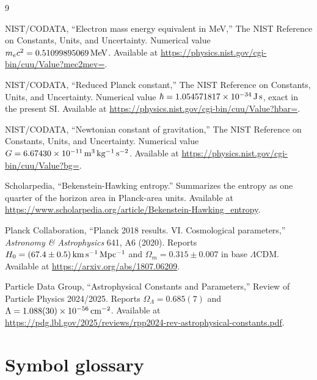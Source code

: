\documentclass[11pt]{article}
\begin{document}
\begin{thebibliography}{9}

NIST/CODATA, ``Electron mass energy equivalent in MeV,'' The NIST Reference on Constants, Units, and Uncertainty. Numerical value $m_ec^2=0.51099895069\,{\rm MeV}$. Available at \url{https://physics.nist.gov/cgi-bin/cuu/Value?mec2mev=}.

NIST/CODATA, ``Reduced Planck constant,'' The NIST Reference on Constants, Units, and Uncertainty. Numerical value $\hbar=1.054571817\times10^{-34}\,{\rm J\,s}$, exact in the present SI. Available at \url{https://physics.nist.gov/cgi-bin/cuu/Value?hbar=}.

NIST/CODATA, ``Newtonian constant of gravitation,'' The NIST Reference on Constants, Units, and Uncertainty. Numerical value $G=6.67430\times10^{-11}\,{\rm m^3\,kg^{-1}\,s^{-2}}$. Available at \url{https://physics.nist.gov/cgi-bin/cuu/Value?bg=}.


Scholarpedia, ``Bekenstein-Hawking entropy.'' Summarizes the entropy as one quarter of the horizon area in Planck-area units. Available at \url{https://www.scholarpedia.org/article/Bekenstein-Hawking_entropy}.

Planck Collaboration, ``Planck 2018 results. VI. Cosmological parameters,'' \emph{Astronomy \& Astrophysics} 641, A6 (2020). Reports $H_0=(67.4\pm0.5)\,{\rm km\,s^{-1}\,Mpc^{-1}}$ and $\Omega_m=0.315\pm0.007$ in base $\Lambda$CDM. Available at \url{https://arxiv.org/abs/1807.06209}.

Particle Data Group, ``Astrophysical Constants and Parameters,'' Review of Particle Physics 2024/2025. Reports $\Omega_\Lambda=0.685(7)$ and $\Lambda=1.088(30)\times10^{-56}\,{\rm cm^{-2}}$. Available at \url{https://pdg.lbl.gov/2025/reviews/rpp2024-rev-astrophysical-constants.pdf}.

\end{thebibliography}

\appendix
\section{Symbol glossary}
\end{document}
